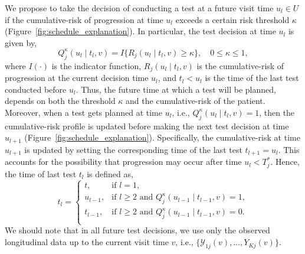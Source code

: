We propose to take the decision of conducting a test at a future visit time $u_l \in U$ if the cumulative-risk of progression at time $u_l$ exceeds a certain risk threshold $\kappa$ (Figure~\ref{fig:schedule_explanation}). In particular, the test decision at time $u_l$ is given by,
\begin{equation}
\label{eq:personalized_decision_grid}
Q_j^\kappa (u_l \mid t_l, v) = I \big \{ R_j(u_l \mid t_l, v) \geq \kappa \big\}, \quad 0 \leq \kappa \leq 1,
\end{equation}
where $I(\cdot)$ is the indicator function, $R_j(u_l \mid t_l, v)$ is the cumulative-risk of progression at the current decision time $u_l$, and $t_l < u_l$ is the time of the last test conducted before $u_l$. Thus, the future time at which a test will be planned, depends on both the threshold $\kappa$ and the cumulative-risk of the patient. Moreover, when a test gets planned at time $u_l$, i.e., $Q_j^\kappa (u_l \mid t_l, v) = 1$, then the cumulative-risk profile is updated before making the next test decision at time $u_{l+1}$ (Figure~\ref{fig:schedule_explanation}). Specifically, the cumulative-risk at time $u_{l+1}$ is updated by setting the corresponding time of the last test $t_{l+1}=u_l$. This accounts for the possibility that progression may occur after time $u_l < T^*_j$. Hence, the time of last test $t_l$ is defined as,
\begin{equation*}
t_l = \left \{ 
\begin{array}{ll}
t, & \mbox{if } l = 1,\\
u_{l-1}, & \mbox{if } l \geq 2 \mbox{ and } Q_j^\kappa (u_{l-1} \mid t_{l-1}, v) = 1,\\
t_{l-1}, & \mbox{if } l \geq 2 \mbox{ and } Q_j^\kappa (u_{l-1} \mid t_{l-1}, v) = 0.\\
\end{array}
\right.
\end{equation*}
We should note that in all future test decisions, we use only the observed longitudinal data up to the current visit time $v$, i.e., $\{\mathcal Y_{1j}(v), \ldots, Y_{Kj}(v)\}$.
